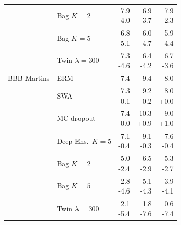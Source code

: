 {\begin{longtable}{llrrr}
     & Bag $K{=}2$ & \makecell[r]{7.9\\-4.0} & \makecell[r]{6.9\\-3.7} & \makecell[r]{7.9\\-2.3} \\
     & Bag $K{=}5$ & \makecell[r]{6.8\\-5.1} & \makecell[r]{6.0\\-4.7} & \makecell[r]{5.9\\-4.4} \\
     & Twin $\lambda{=}300$ & \makecell[r]{7.3\\-4.6} & \makecell[r]{6.4\\-4.2} & \makecell[r]{6.7\\-3.6} \\
    \midrule
    BBB-Martins & ERM & \makecell[r]{7.4\\\strut} & \makecell[r]{9.4\\\strut} & \makecell[r]{8.0\\\strut} \\
     & SWA & \makecell[r]{7.3\\-0.1} & \makecell[r]{9.2\\-0.2} & \makecell[r]{8.0\\+0.0} \\
     & MC dropout & \makecell[r]{7.4\\-0.0} & \makecell[r]{10.3\\+0.9} & \makecell[r]{9.0\\+1.0} \\
     & Deep Ens.\ $K{=}5$ & \makecell[r]{7.1\\-0.4} & \makecell[r]{9.1\\-0.3} & \makecell[r]{7.6\\-0.4} \\
     & Bag $K{=}2$ & \makecell[r]{5.0\\-2.4} & \makecell[r]{6.5\\-2.9} & \makecell[r]{5.3\\-2.7} \\
     & Bag $K{=}5$ & \makecell[r]{2.8\\-4.6} & \makecell[r]{5.1\\-4.3} & \makecell[r]{3.9\\-4.1} \\
     & Twin $\lambda{=}300$ & \makecell[r]{2.1\\-5.4} & \makecell[r]{1.8\\-7.6} & \makecell[r]{0.6\\-7.4} \\

\end{longtable}}
